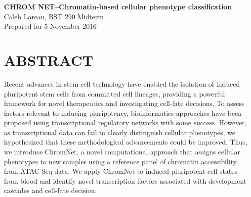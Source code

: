 \documentclass[12pt]{article}
\begin{document}
    \begin{flushleft}
    \textbf{
    {\huge C}{\Large HROM} {\huge N}{\Large ET--Chromatin-based cellular phenotype classification}}\\
     \hspace*{4mm} Caleb Lareau, BST 290 Midterm\\
     \hspace*{4mm} Prepared for 5 November 2016
         \end{flushleft}

\section{\textbf{{\Large A}{\small BSTRACT }}}
Recent advances in stem cell technology have enabled the isolation of induced pluripotent stem cells from committed cell lineages, providing a powerful framework for novel therapeutics and investigating cell-fate decisions. To assess factors relevant to inducing pluripotency, bioinformatics approaches have been proposed using transcriptional regulatory networks with some success. However, as transcriptional data can fail to clearly distinguish cellular phenotypes, we hypothesized that these methodological advancements could be improved. Thus, we introduce ChromNet, a novel computational approach that assigns cellular phenotypes to new samples using a reference panel of chromatin accessibility from ATAC-Seq data. We apply ChromNet to induced pluripotent cell states from blood and identify novel transcription factors associated with development cascades and cell-fate decision. 
\end{document}
